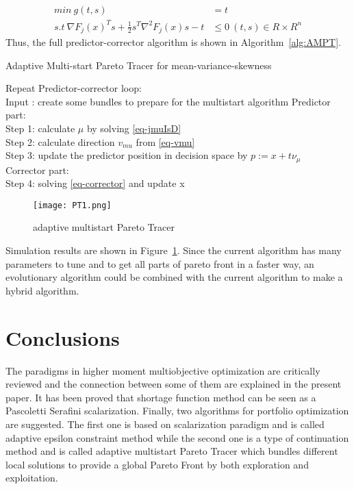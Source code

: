 \documentclass[12pt,a4paper]{article}
\numberwithin{equation}{section}
\begin{document}
\begin{equation}  \label{eq-corrector}
\begin{split}
min \  g(t,s)&=t  \\
s.t \ \nabla F_{j}(x)^{T}s+\frac{1}{2}s^{T}\nabla^{2}F_{j}(x)s-t&\leq 0   \  (t,s)\in R \times R^{n}  
\end{split}
\end{equation}
Thus, the full predictor-corrector algorithm is shown in Algorithm~\ref{alg:AMPT}.
\begin{algorithm}[H]
\caption{Adaptive Multi-start Pareto Tracer for mean-variance-skewness }
\label{alg:AMPT}
Repeat Predictor-corrector loop: \\
Input : create some bundles to prepare for the multistart algorithm
Predictor part:  \\
Step 1: calculate $\mu$ by solving \eqref{eq-jmuIsD} \\
Step 2: calculate direction $v_{mu}$ from \eqref{eq-vmu}  \\
Step 3: update the predictor position in decision space by $p:=x+t\nu_{\mu}$ \\
Corrector part:  \\
Step 4: solving \eqref{eq-corrector} and update x  
\end{algorithm}    
\begin{figure}
  \texttt{[image: PT1.png]}
  \caption{adaptive multistart Pareto Tracer}
  \label{fig:PT1}
\end{figure}
Simulation results are shown in  Figure~\ref{fig:PT1}. Since the current algorithm has many parameters to tune and to get all parts of pareto front in a faster way, an evolutionary algorithm could be combined with the current algorithm to make a hybrid algorithm.
\section{Conclusions}
The paradigms in higher moment multiobjective optimization are critically reviewed and the connection between some of them are explained in the present paper. It has been proved that shortage function method can be seen as a Pascoletti Serafini scalarization. Finally, two algorithms for portfolio optimization are suggested. The first one is based on scalarization paradigm and is called adaptive epsilon constraint method while the second one is a type of continuation method and is called adaptive multistart Pareto Tracer which bundles different local solutions to provide a global Pareto Front by both exploration and exploitation.
 
\end{document}
